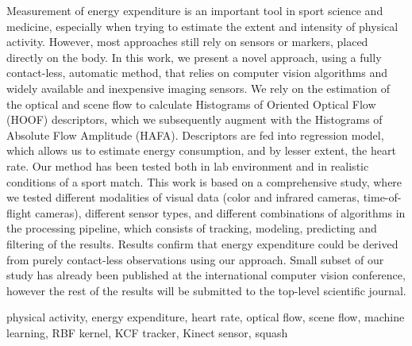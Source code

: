\abstractp
Measurement of energy expenditure is an important tool in sport science and medicine, especially when trying to estimate the extent and intensity of physical activity. However, most approaches still rely on sensors or markers, placed directly on the body. In this work, we present a novel approach, using a fully contact-less, automatic method, that relies on computer vision algorithms and widely available and inexpensive imaging sensors. We rely on the estimation of the optical and scene flow to calculate Histograms of Oriented Optical Flow (HOOF) descriptors, which we subsequently augment with the Histograms of Absolute Flow Amplitude (HAFA). Descriptors are fed into regression model, which allows us to estimate energy consumption, and by lesser extent, the heart rate. Our method has been tested both in lab environment and in realistic conditions of a sport match. This work is based on a comprehensive study, where we tested different modalities of visual data (color and infrared cameras, time-of-flight cameras), different sensor types, and different combinations of algorithms in the processing pipeline, which consists of tracking, modeling, predicting and filtering of the results. Results confirm that energy expenditure could be derived from purely contact-less observations using our approach. Small subset of our study has already been published at the international computer vision conference, however the rest of the results will be submitted to the top-level scientific journal.

\keywords physical activity, energy expenditure, heart rate, optical flow, scene flow, machine learning, RBF kernel, KCF tracker, Kinect sensor, squash